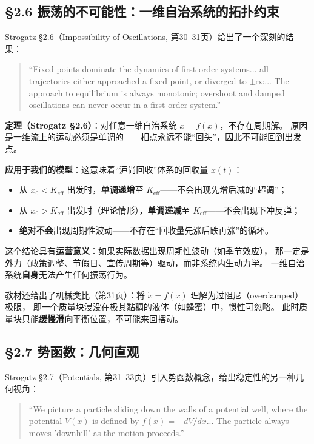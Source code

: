 \documentclass[12pt,a4paper]{article}
\begin{document}
\subsection{\S2.6 振荡的不可能性：一维自治系统的拓扑约束}

Strogatz \S2.6（Impossibility of Oscillations, 第30--31页）给出了一个深刻的结果：

\begin{quote}
\small
``Fixed points dominate the dynamics of first-order systems... all trajectories either
approached a fixed point, or diverged to $\pm\infty$... The approach to equilibrium is
always monotonic; overshoot and damped oscillations can never occur in a first-order system.''
\end{quote}

\textbf{定理（Strogatz \S2.6）}：对任意一维自治系统 $\dot{x} = f(x)$，不存在周期解。
原因是一维流上的运动必须是单调的——相点永远不能``回头''，因此不可能回到出发点。

\textbf{应用于我们的模型}：这意味着``沪尚回收''体系的回收量 $x(t)$：
\begin{itemize}
  \item 从 $x_0 < K_{\text{eff}}$ 出发时，\textbf{单调递增}至 $K_{\text{eff}}$——不会出现先增后减的``超调''；
  \item 从 $x_0 > K_{\text{eff}}$ 出发时（理论情形），\textbf{单调递减}至 $K_{\text{eff}}$——不会出现下冲反弹；
  \item \textbf{绝对不会}出现周期性波动——不存在``回收量先涨后跌再涨''的循环。
\end{itemize}

这个结论具有\textbf{运营意义}：如果实际数据出现周期性波动（如季节效应），
那一定是外力（政策调整、节假日、宣传周期等）驱动，而非系统内生动力学。
一维自治系统\textbf{自身}无法产生任何振荡行为。

教材还给出了机械类比（第31页）：将 $\dot{x} = f(x)$ 理解为过阻尼（overdamped）极限，
即一个质量块浸没在极其黏稠的液体（如蜂蜜）中，惯性可忽略。
此时质量块只能\textbf{缓慢滑向}平衡位置，不可能来回摆动。

\subsection{\S2.7 势函数：几何直观}

Strogatz \S2.7（Potentials, 第31--33页）引入势函数概念，给出稳定性的另一种几何视角：

\begin{quote}
\small
``We picture a particle sliding down the walls of a potential well, where the potential $V(x)$
is defined by $f(x) = -dV/dx$... The particle always moves 'downhill' as the motion proceeds.''
\end{quote}
\end{document}
